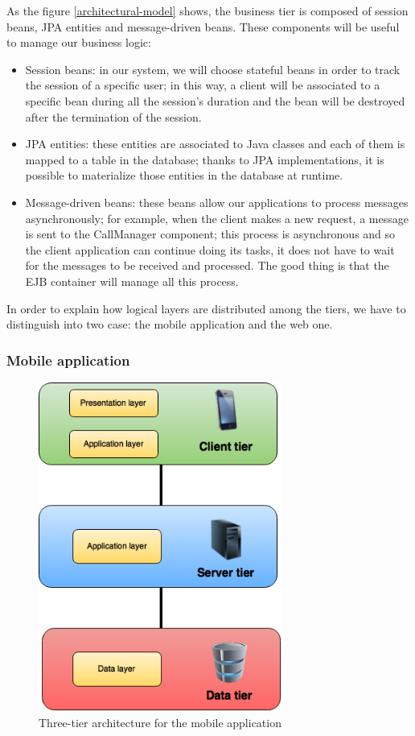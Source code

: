 As the figure \ref{architectural-model} shows, the business tier is composed of session beans, JPA entities and message-driven beans. These components will be useful to manage our business logic:
    \begin{itemize}
        \item Session beans: in our system, we will choose stateful beans in order to track the session of a specific user; in this way, a client will be associated to a specific bean during all the session's duration and the bean will be destroyed after the termination of the session.
        \item JPA entities: these entities are associated to Java classes and each of them is mapped to a table in the database; thanks to JPA implementations, it is possible to materialize those entities in the database at runtime.
        \item Message-driven beans: these beans allow our applications to process messages asynchronously; for example, when the client makes a new request, a message is sent to the CallManager component; this process is asynchronous and so the client application can continue doing its tasks, it does not have to wait for the messages to be received and processed. The good thing is that the EJB container will manage all this process. 
    \end{itemize}
In order to explain how logical layers are distributed among the tiers, we have to distinguish into two case: the mobile application and the web one.

\subsubsection{Mobile application}

    \begin{figure}[H]
        \centering
        \includegraphics[width=8cm]{./Images/MobileApplication.png}
        \caption{Three-tier architecture for the mobile application}
    \end{figure}

